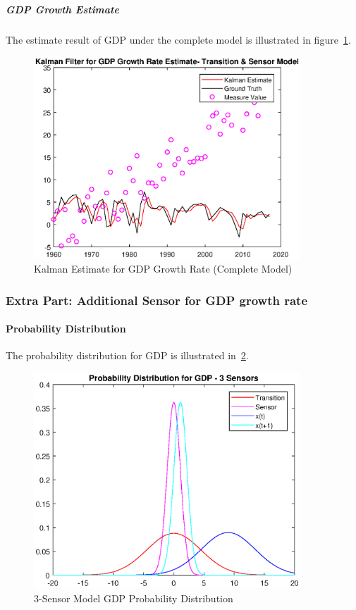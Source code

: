 \documentclass[11pt, a4paper]{article}
\begin{document}
\newpage

\subparagraph{GDP Growth Estimate}

The estimate result of GDP under the complete model is illustrated in figure~\ref{fig:kf4}.

\begin{figure}[htbp]
	
	\centering 
	\includegraphics[width=10cm]{kf_1_4}
	
	\caption{Kalman Estimate for GDP Growth Rate (Complete Model)}
	\label{fig:kf4}
	
\end{figure}


\subsubsection{Extra Part: Additional Sensor for GDP growth rate }

\paragraph{Probability Distribution}

The probability distribution for GDP is illustrated in~\ref{fig:pd_3}.

\begin{figure}[htbp]
	
	\centering 
	\includegraphics[width=10cm]{pd_3}
	
	\caption{3-Sensor Model GDP Probability Distribution}
	\label{fig:pd_3}
	
\end{figure}
\end{document}
